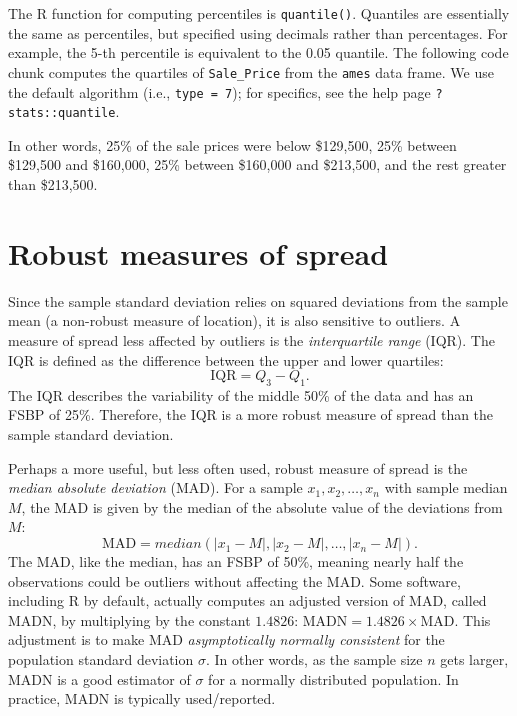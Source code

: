 \documentclass[]{book}
\newenvironment{Shaded}{\begin{snugshade}}{\end{snugshade}}
\newcommand{\DataTypeTok}[1]{\textcolor[rgb]{0.13,0.29,0.53}{#1}}
\newcommand{\FloatTok}[1]{\textcolor[rgb]{0.00,0.00,0.81}{#1}}
\newcommand{\KeywordTok}[1]{\textcolor[rgb]{0.13,0.29,0.53}{\textbf{#1}}}
\newcommand{\NormalTok}[1]{#1}
\theoremstyle{definition}
\theoremstyle{definition}
\theoremstyle{definition}
\theoremstyle{remark}
\begin{document}
The R function for computing percentiles is \texttt{quantile()}.
Quantiles are essentially the same as percentiles, but specified using
decimals rather than percentages. For example, the 5-th percentile is
equivalent to the 0.05 quantile. The following code chunk computes the
quartiles of \texttt{Sale\_Price} from the \texttt{ames} data frame. We
use the default algorithm (i.e., \texttt{type\ =\ 7}); for specifics,
see the help page \texttt{?stats::quantile}.

\begin{Shaded}
\end{Shaded}

In other words, 25\% of the sale prices were below \$129,500, 25\%
between \$129,500 and \$160,000, 25\% between \$160,000 and \$213,500,
and the rest greater than \$213,500.

\hypertarget{robust-measures-of-spread}{%
\section{Robust measures of spread}\label{robust-measures-of-spread}}

Since the sample standard deviation relies on squared deviations from
the sample mean (a non-robust measure of location), it is also sensitive
to outliers. A measure of spread less affected by outliers is the
\emph{interquartile range} (IQR). The IQR is defined as the difference
between the upper and lower quartiles: \begin{equation*}
  \text{IQR} = Q_3 - Q_1.
\end{equation*} The IQR describes the variability of the middle 50\% of
the data and has an FSBP of 25\%. Therefore, the IQR is a more robust
measure of spread than the sample standard deviation.

Perhaps a more useful, but less often used, robust measure of spread is
the \emph{median absolute deviation} (MAD). For a sample
\(x_1, x_2, \dots, x_n\) with sample median \(M\), the MAD is given by
the median of the absolute value of the deviations from \(M\):
\begin{equation*}
  \text{MAD} = median\left(\left|x_1 - M\right|, \left|x_2 - M\right|, \dots, \left|x_n - M\right|\right).
\end{equation*} The MAD, like the median, has an FSBP of 50\%, meaning
nearly half the observations could be outliers without affecting the
MAD. Some software, including R by default, actually computes an
adjusted version of MAD, called MADN, by multiplying by the constant
\(1.4826\): \(\text{MADN} = 1.4826 \times \text{MAD}\). This adjustment
is to make MAD \emph{asymptotically normally consistent} for the
population standard deviation \(\sigma\). In other words, as the sample
size \(n\) gets larger, MADN is a good estimator of \(\sigma\) for a
normally distributed population. In practice, MADN is typically
used/reported.
\end{document}

